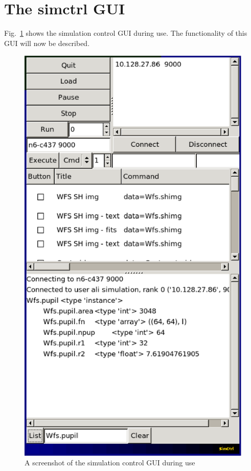 \documentclass{article}
\begin{document}
\section{The simctrl GUI}
Fig.~\ref{fig:simctrl} shows the simulation control GUI during use.
The functionality of this GUI will now be described.
\begin{figure}
\includegraphics{pics/simctrlmain.eps}
\caption{A screenshot of the simulation control GUI during use}
\label{fig:simctrl}
\end{figure}
\end{document}
